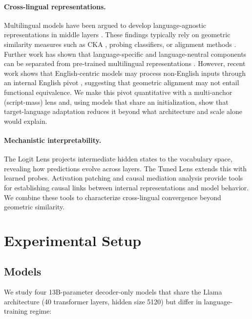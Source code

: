 \documentclass[11pt]{article}
\begin{document}
\paragraph{Cross-lingual representations.}
Multilingual models have been argued to develop language-agnostic representations in middle layers \citep{pires-etal-2019-multilingual, conneau-etal-2020-emerging, chi-etal-2020-finding, wu-dredze-2020-languages}. These findings typically rely on geometric similarity measures such as CKA \citep{kornblith2019similarity}, probing classifiers, or alignment methods \citep{cao-etal-2020-multilingual}. Further work has shown that language-specific and language-neutral components can be separated from pre-trained multilingual representations \citep{libovicky-etal-2020-language}. However, recent work shows that English-centric models may process non-English inputs through an internal English pivot \citep{wendler2024llamas}, suggesting that geometric alignment may not entail functional equivalence. We make this pivot quantitative with a multi-anchor (script-mass) lens and, using models that share an initialization, show that target-language adaptation reduces it beyond what architecture and scale alone would explain.

\paragraph{Mechanistic interpretability.}
The Logit Lens \citep{nostalgebraist2020logitlens} projects intermediate hidden states to the vocabulary space, revealing how predictions evolve across layers. The Tuned Lens \citep{belrose2023eliciting} extends this with learned probes. Activation patching \citep{meng2022locating, geiger2021causal} and causal mediation analysis \citep{vig-etal-2020-causal} provide tools for establishing causal links between internal representations and model behavior. We combine these tools to characterize cross-lingual convergence beyond geometric similarity.

\section{Experimental Setup}

\subsection{Models}

We study four 13B-parameter decoder-only models that share the Llama architecture (40 transformer layers, hidden size 5120) but differ in language-training regime:
\end{document}
